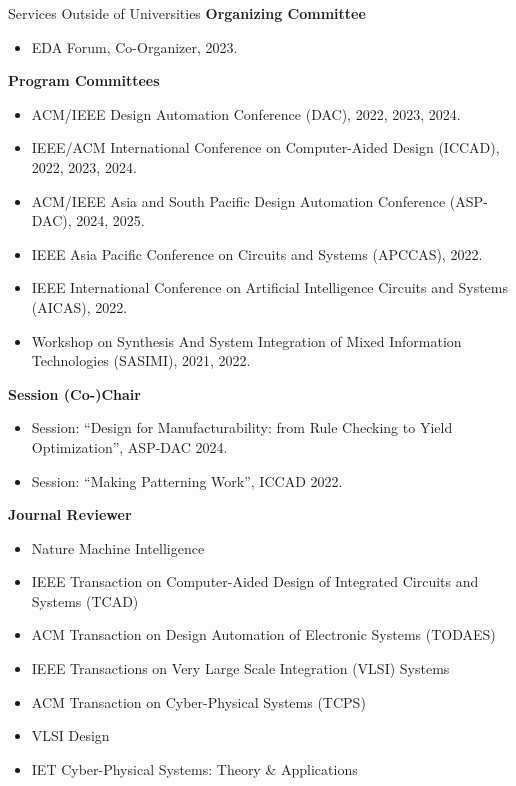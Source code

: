 
\begin{rSection}{Services Outside of Universities}
\textbf{Organizing Committee}
\begin{itemize}
	\item EDA Forum, Co-Organizer, 2023.
\end{itemize}

\textbf{Program Committees}
\begin{itemize}
    \item ACM/IEEE Design Automation Conference (DAC), 2022, 2023, 2024.
    \item IEEE/ACM International Conference on Computer-Aided Design (ICCAD), 2022, 2023, 2024.
    \item ACM/IEEE Asia and South Pacific Design Automation Conference (ASP-DAC), 2024, 2025.
    \item IEEE Asia Pacific Conference on Circuits and Systems (APCCAS), 2022.
    \item IEEE International Conference on Artificial Intelligence Circuits and Systems (AICAS), 2022.
    \item Workshop on Synthesis And System Integration of Mixed Information Technologies (SASIMI), 2021, 2022.
\end{itemize}

\textbf{Session (Co-)Chair}
\begin{itemize}
	\item Session: ``Design for Manufacturability: from Rule Checking to Yield Optimization'', ASP-DAC 2024.
    \item Session: ``Making Patterning Work'', ICCAD 2022.
\end{itemize}

\textbf{Journal Reviewer}
\begin{itemize}
    \item Nature Machine Intelligence
    \item IEEE Transaction on Computer-Aided Design of Integrated Circuits and Systems (TCAD)
    \item ACM Transaction on Design Automation of Electronic Systems (TODAES)
    \item IEEE Transactions on Very Large Scale Integration (VLSI) Systems
    \item ACM Transaction on Cyber-Physical Systems (TCPS)
    \item VLSI Design
    \item IET Cyber-Physical Systems: Theory \& Applications
\end{itemize}


\end{rSection}
